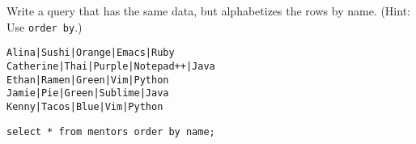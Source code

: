 \begin{blocksection}
\question Write a query that has the same data, but alphabetizes the rows by name. (Hint: Use \lstinline$order by$.)

\begin{lstlisting}
Alina|Sushi|Orange|Emacs|Ruby
Catherine|Thai|Purple|Notepad++|Java
Ethan|Ramen|Green|Vim|Python
Jamie|Pie|Green|Sublime|Java
Kenny|Tacos|Blue|Vim|Python
\end{lstlisting}

\begin{solution}[1in]
\begin{lstlisting}
select * from mentors order by name;
\end{lstlisting}
\end{solution}
\end{blocksection}
